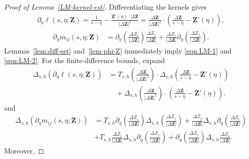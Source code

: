 \documentclass[11pt,reqno]{amsart}
\theoremstyle{plain}
\theoremstyle{definition}
\numberwithin{equation}{section}
\newcommand{\paren}[1]{\left(#1\right)}
\newcommand{\p}{\partial}
\newcommand{\bm}[1]{\boldsymbol{#1}}
\newcommand{\abs}[1]{\left\lvert #1 \right\rvert}
\begin{document}
\begin{proof}[Proof of Lemma~\ref{LM-kernel-est}]
Differentiating the kernels gives
\begin{equation}
\begin{aligned}
    \p_\eta \ell(s,\eta;\bm Z) = \frac{1}{s-\eta} - \frac{\bm Z'(\eta)\cdot \Delta \bm Z}{|\Delta \bm Z|^2} = \frac{\Delta \bm Z}{\abs{\Delta\bm Z}^2}\cdot\paren{ \frac{\Delta \bm Z}{s-\eta} -\bm Z'(\eta) },
\end{aligned}
\end{equation}
\begin{equation}
\begin{aligned}
    \p_\eta m_{ij}(s,\eta;\bm Z) &= \p_\eta\paren{\frac{\Delta Z_i}{|\Delta\bm Z|}} \frac{\Delta Z_j}{|\Delta\bm Z|} + \frac{\Delta Z_i}{|\Delta\bm Z|}\p_\eta\paren{\frac{\Delta Z_j}{|\Delta\bm Z|}} .
\end{aligned}
\end{equation}
Lemmas~\ref{lem:diff-est} and~\ref{lem-phi-Z} immediately imply
\eqref{eqn:LM-1} and \eqref{eqn:LM-2}. For the finite-difference bounds,
expand
\begin{equation}
\begin{aligned}
    \Delta_{s,h}(\p_\eta \ell(s,\eta;\bm Z))
    &= T_{s,h}\paren{\frac{\Delta \bm Z}{\abs{\Delta\bm Z}^2}}
    \cdot\Delta_{s,h}\paren{
    \frac{\Delta \bm Z}{s-\eta} -\bm Z'(\eta) } \\
    &\quad
    + \Delta_{s,h}\paren{\frac{\Delta \bm Z}{\abs{\Delta\bm Z}^2}}
    \cdot\paren{ \frac{\Delta \bm Z}{s-\eta} -\bm Z'(\eta) }.
\end{aligned}
\end{equation}
and
\begin{equation}
\begin{aligned}
    \Delta_{s,h}(\p_\eta m_{ij}(s,\eta;\bm Z)) &= T_{s,h}\p_\eta\paren{\frac{\Delta Z_i}{|\Delta\bm Z|}} \Delta_{s,h}\paren{ \frac{\Delta Z_j}{|\Delta\bm Z|} } + \frac{\Delta Z_j}{|\Delta\bm Z|}  \Delta_{s,h}\p_\eta\paren{\frac{\Delta Z_i}{|\Delta\bm Z|}} \\
    &+ T_{s,h}\frac{\Delta Z_i}{|\Delta\bm Z|}\Delta_{s,h}\p_\eta\paren{\frac{\Delta Z_j}{|\Delta\bm Z|}} + \p_\eta\paren{\frac{\Delta Z_j}{|\Delta\bm Z|}}\Delta_{s,h}\frac{\Delta Z_i}{|\Delta\bm Z|} .
\end{aligned}
\end{equation}
Moreover,

\end{proof}
\end{document}
